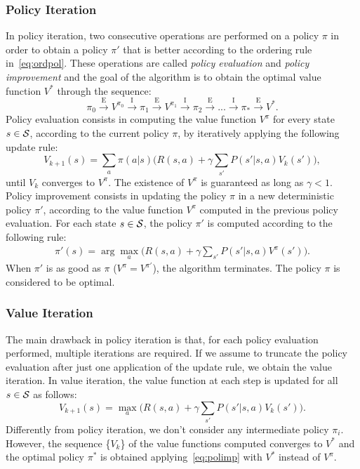 \subsubsection{Policy Iteration}
In policy iteration, two consecutive operations are performed on a policy $\pi$ in order to obtain a policy $\pi'$ that is better according to the ordering rule in~\eqref{eq:ordpol}. These operations are called \emph{policy evaluation} and \emph{policy improvement} and the goal of the algorithm is to obtain the optimal value function $V^{*}$ through the sequence:
$$ \pi_{0} \xrightarrow{\text{E}} V^{\pi_{0}} \xrightarrow{\text{I}} \pi_{1} \xrightarrow{\text{E}} V^{\pi_{1}} \xrightarrow{\text{I}} \pi_{2} \xrightarrow{\text{E}} ... \xrightarrow{\text{I}} \pi_{*} \xrightarrow{\text{E}} V^{*}.
$$
Policy evaluation consists in computing the value function $V^{\pi}$ for every state $s \in \mathcal{S}$, according to the current policy $\pi$, by iteratively applying the following update rule:
$$
V_{k+1}(s) = \sum_{a}\pi(a|s) \Big( R(s,a) + \gamma \sum_{s'}P(s'|s,a) V_{k}(s') \Big),
$$
until $V_{k}$ converges to $V^{\pi}$. The existence of $V^{\pi}$ is guaranteed as long as $\gamma < 1$.  \\
\newline
Policy improvement consists in updating the policy $\pi$ in a new deterministic policy $\pi'$, according to the value function $V^{\pi}$ computed in the previous policy evaluation. For each state $s \in \mathcal{S}$, the policy $\pi'$ is computed according to the following rule:
\begin{align} 
\pi'(s) = \arg \max_{a} \Big( R(s,a) + \gamma \sum_{s'} P(s'|s,a)  V^{\pi}(s') \Big). \label{eq:polimp}
\end{align}
When $\pi'$ is as good as $\pi$ (\ie $V^{\pi} = V^{\pi'}$), the algorithm terminates. The policy $\pi$ is considered to be optimal.
\subsubsection{Value Iteration} \label{subsec:vi}
The main drawback in policy iteration is that, for each policy evaluation performed, multiple iterations are required. If we assume to truncate the policy evaluation after just one application of the update rule, we obtain the value iteration. In value iteration, the value function at each step is updated for all $s \in \mathcal{S}$ as follows:
$$ V_{k+1}(s) = \max_a \Big( R(s,a) + \gamma \sum_{s'}P(s'|s,a)  V_{k}(s') \Big).
$$
Differently from policy iteration, we don't consider any intermediate policy $\pi_i$. However, the sequence \{$V_{k}$\} of the value functions computed converges to $V^{*}$  and the optimal policy $\pi^{*}$ is obtained applying~\eqref{eq:polimp} with $V^{*}$ instead of $V^{\pi}$.

